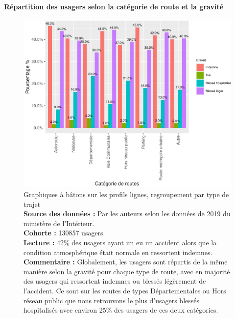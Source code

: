 \documentclass[french,]{tp}
\let\oldparagraph\paragraph
\renewcommand{\paragraph}[1]{\oldparagraph{#1}\mbox{}}
\begin{document}
\newpage

\hypertarget{ruxe9partition-des-usagers-selon-la-catuxe9gorie-de-route-et-la-gravituxe9}{%
\paragraph{Répartition des usagers selon la catégorie de route et la gravité}\label{ruxe9partition-des-usagers-selon-la-catuxe9gorie-de-route-et-la-gravituxe9}}







\begin{figure}[ht!]

{\centering \includegraphics{Prediction_Gravite_files/figure-latex/barplotroute-1} 

}

\caption{Graphiques à bâtons sur les profils lignes, regroupement par type de trajet\\
\textbf{Source des données :} Par les auteurs selon les données de 2019 du ministère de l'Intérieur.\\
\textbf{Cohorte :} 130857 usagers.\\
\textbf{Lecture :} 42\% des usagers ayant un eu un accident alors que la condition atmosphérique était normale en ressortent indemnes.
\textbf{Commentaire :} Globalement, les usagers sont répartis de la même manière selon la gravité pour chaque type de route, avec en majorité des usagers qui ressortent indemnes ou blessés légèrement de l'accident. Ce sont sur les routes de types Départementales ou Hors réseau public que nous retrouvons le plus d'usagers blessés hospitalisés avec environ 25\% des usagers de ces deux catégories.}\label{fig:barplotroute}
\end{figure}
\end{document}
